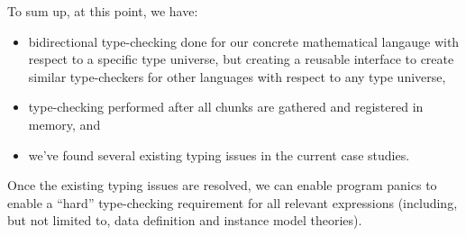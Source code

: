 To sum up, at this point, we have:

\begin{itemize}
      \item bidirectional type-checking done for our concrete mathematical
            langauge with respect to a specific type universe, but creating a
            reusable interface to create similar type-checkers for other
            languages with respect to any type universe,
      \item type-checking performed after all chunks are gathered and registered
            in memory, and
      \item we've found several existing typing issues in the current case
            studies.
\end{itemize}

Once the existing typing issues are resolved, we can enable program panics to
enable a ``hard'' type-checking requirement for all relevant expressions
(including, but not limited to, data definition and instance model theories).
